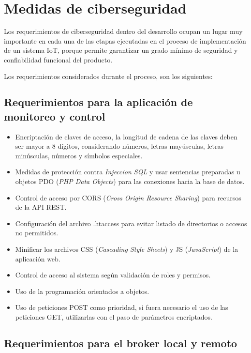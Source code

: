 \section{Medidas de ciberseguridad}

Los requerimientos de ciberseguridad dentro del desarrollo ocupan un lugar muy importante en cada una de las etapas ejecutadas en el proceso de implementación de un sistema IoT, porque permite garantizar un grado mínimo de seguridad y confiabilidad funcional del producto. 

Los requerimientos considerados durante el proceso, son los siguientes:

\subsection{Requerimientos para la aplicación de monitoreo y control}

\begin{itemize}
\item Encriptación de claves de acceso, la longitud de cadena de las claves  deben ser mayor a 8 dígitos, considerando números, letras mayúsculas, letras minúsculas, números y símbolos especiales.
\item Medidas de protección contra \emph{Injeccion SQL} y usar sentencias preparadas u objetos PDO (\emph{PHP Data Objects}) para las conexiones hacia la base de datos.
\item Control de acceso por CORS (\emph{Cross Origin Resource Sharing}) para recursos de la API REST.
\item Configuración del archivo .htaccess para evitar listado de directorios o accesos no permitidos.
\item Minificar los archivos CSS (\emph{Cascading Style Sheets}) y JS (\emph{JavaScript}) de la aplicación web.
\item Control de acceso al sistema según validación de roles y permisos.
\item Uso de la programación orientados a objetos.
\item Uso de peticiones POST como prioridad, si fuera necesario el uso de las peticiones GET, utilizarlas con el paso de parámetros encriptados.
\end{itemize}

\subsection{Requerimientos para el broker local y remoto}

